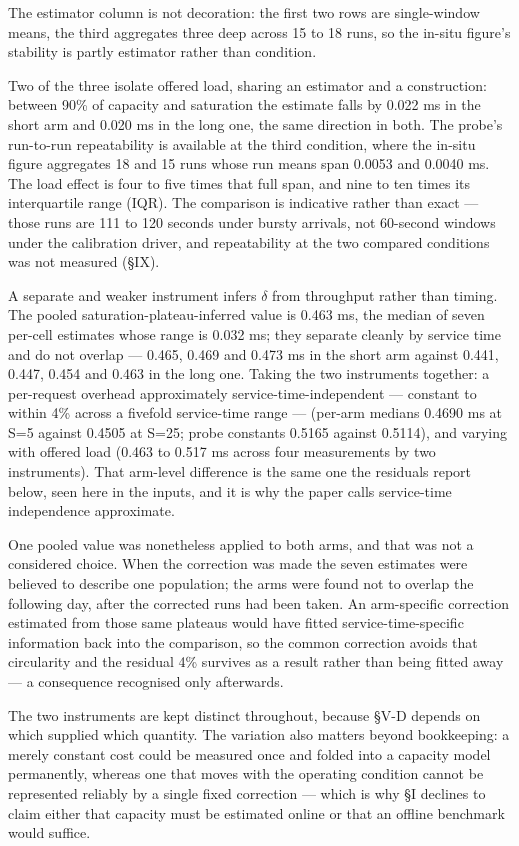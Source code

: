 \documentclass{ieeeaccess}
\begin{document}
The estimator column is not decoration: the first two rows are single-window means, the third aggregates three deep across 15 to 18 runs, so the in-situ figure's stability is partly estimator rather than condition.

Two of the three isolate offered load, sharing an estimator and a construction: between 90\% of capacity and saturation the estimate falls by 0.022 ms in the short arm and 0.020 ms in the long one, the same direction in both. The probe's run-to-run repeatability is available at the third condition, where the in-situ figure aggregates 18 and 15 runs whose run means span 0.0053 and 0.0040 ms. The load effect is four to five times that full span, and nine to ten times its interquartile range (IQR). The comparison is indicative rather than exact --- those runs are 111 to 120 seconds under bursty arrivals, not 60-second windows under the calibration driver, and repeatability at the two compared conditions was not measured (\S{}IX).

A separate and weaker instrument infers $\delta$ from throughput rather than timing. The pooled saturation-plateau-inferred value is 0.463 ms, the median of seven per-cell estimates whose range is 0.032 ms; they separate cleanly by service time and do not overlap --- 0.465, 0.469 and 0.473 ms in the short arm against 0.441, 0.447, 0.454 and 0.463 in the long one. Taking the two instruments together: a per-request overhead approximately service-time-independent --- constant to within 4\% across a fivefold service-time range --- (per-arm medians 0.4690 ms at S=5 against 0.4505 at S=25; probe constants 0.5165 against 0.5114), and varying with offered load (0.463 to 0.517 ms across four measurements by two instruments). That arm-level difference is the same one the residuals report below, seen here in the inputs, and it is why the paper calls service-time independence approximate.

One pooled value was nonetheless applied to both arms, and that was not a considered choice. When the correction was made the seven estimates were believed to describe one population; the arms were found not to overlap the following day, after the corrected runs had been taken. An arm-specific correction estimated from those same plateaus would have fitted service-time-specific information back into the comparison, so the common correction avoids that circularity and the residual 4\% survives as a result rather than being fitted away --- a consequence recognised only afterwards.

The two instruments are kept distinct throughout, because \S{}V-D depends on which supplied which quantity. The variation also matters beyond bookkeeping: a merely constant cost could be measured once and folded into a capacity model permanently, whereas one that moves with the operating condition cannot be represented reliably by a single fixed correction --- which is why \S{}I declines to claim either that capacity must be estimated online or that an offline benchmark would suffice.
\end{document}
